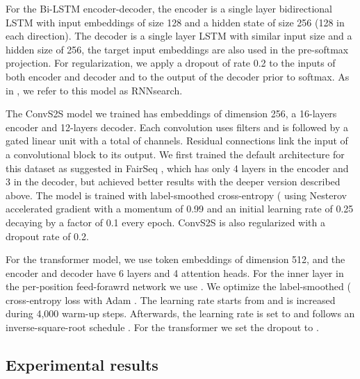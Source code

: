\documentclass[11pt,a4paper]{article}
\begin{document}
For the Bi-LSTM encoder-decoder, the encoder is a single layer bidirectional LSTM with input embeddings of size 128 and a hidden state of size 256 (128 in each direction). The decoder is a single layer LSTM with similar input size and a hidden size of 256, the target input embeddings are also used in the pre-softmax projection. For regularization, we apply a dropout of rate 0.2 to the inputs of both encoder and decoder and to the output of the decoder prior to softmax. As in \cite{bahdanau15iclr}, we  refer to this model as RNNsearch.

The ConvS2S model we trained has embeddings of dimension 256, a 16-layers encoder and 12-layers decoder. Each convolution uses  filters and is followed by a gated linear unit with a total of  channels. Residual connections link the input of a convolutional block to its output.
We first trained the default architecture for this dataset as suggested in FairSeq \cite{gehring17icml}, which has only 4 layers in the encoder and 3 in the decoder, but achieved better results with the deeper version described above.
The model is trained with label-smoothed cross-entropy ( using Nesterov accelerated gradient  with a momentum of 0.99 and an initial learning rate of 0.25 decaying by a factor of 0.1 every epoch. ConvS2S is also regularized with a dropout rate of 0.2.

For the transformer model,
we use token embeddings of dimension 512, and the encoder and decoder have 6 layers and 4 attention heads. For the inner layer in the per-position feed-forawrd network we use .
We optimize the label-smoothed ( cross-entropy loss with Adam  \cite{kingma15iclr}. The learning rate starts from  and is increased during 4,000 warm-up steps. Afterwards, the learning rate is set to  and follows an inverse-square-root schedule \cite{vaswani17nips}. For the transformer we set the dropout to .

\subsection{Experimental results}
\end{document}
